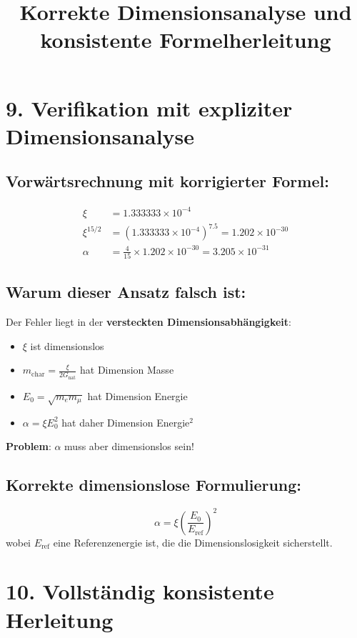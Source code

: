 \documentclass[12pt, a4paper]{article}
\title{Korrekte Dimensionsanalyse und konsistente Formelherleitung}
\author{}
\date{}
\begin{document}
	
	\maketitle
	
	\section*{9. Verifikation mit expliziter Dimensionsanalyse}
	
	\subsection*{Vorwärtsrechnung mit korrigierter Formel:}
	\begin{align*}
		\xi &= 1.333333 \times 10^{-4} \\
		\xi^{15/2} &= (1.333333 \times 10^{-4})^{7.5} = 1.202 \times 10^{-30} \\
		\alpha &= \frac{4}{15} \times 1.202 \times 10^{-30} = 3.205 \times 10^{-31}
	\end{align*}
	
	\subsection*{Warum dieser Ansatz falsch ist:}
	
	Der Fehler liegt in der \textbf{versteckten Dimensionsabhängigkeit}:
	
	\begin{itemize}
		\item $\xi$ ist dimensionslos
		\item $m_{\text{char}} = \frac{\xi}{2G_{\text{nat}}}$ hat Dimension Masse
		\item $E_0 = \sqrt{m_e m_\mu}$ hat Dimension Energie
		\item $\alpha = \xi E_0^2$ hat daher Dimension Energie$^2$
	\end{itemize}
	
	\textbf{Problem}: $\alpha$ muss aber dimensionslos sein!
	
	\subsection*{Korrekte dimensionslose Formulierung:}
	\[
	\alpha = \xi \left(\frac{E_0}{E_{\text{ref}}}\right)^2
	\]
	wobei $E_{\text{ref}}$ eine Referenzenergie ist, die die Dimensionslosigkeit sicherstellt.
	
	\section*{10. Vollständig konsistente Herleitung}
	
\end{document}

